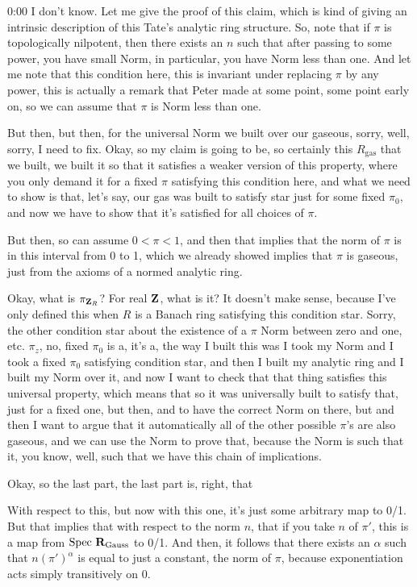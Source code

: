 \begin{unfinished}{0:00}
I don't know. Let me give the proof of this claim, which is kind of giving an intrinsic description of this Tate's analytic ring structure. So, note that if $\pi$ is topologically nilpotent, then there exists an $n$ such that after passing to some power, you have small Norm, in particular, you have Norm less than one. And let me note that this condition here, this is invariant under replacing $\pi$ by any power, this is actually a remark that Peter made at some point, some point early on, so we can assume that $\pi$ is Norm less than one.

But then, but then, for the universal Norm we built over our gaseous, sorry, well, sorry, I need to fix. Okay, so my claim is going to be, so certainly this $R_\mathrm{gas}$ that we built, we built it so that it satisfies a weaker version of this property, where you only demand it for a fixed $\pi$ satisfying this condition here, and what we need to show is that, let's say, our gas was built to satisfy star just for some fixed $\pi_0$, and now we have to show that it's satisfied for all choices of $\pi$.

But then, so can assume $0 < \pi < 1$, and then that implies that the norm of $\pi$ is in this interval from 0 to 1, which we already showed implies that $\pi$ is gaseous, just from the axioms of a normed analytic ring.

Okay, what is $\pi_{\mathbf Z_R}$? For real $\mathbf Z$, what is it? It doesn't make sense, because I've only defined this when $R$ is a Banach ring satisfying this condition star. Sorry, the other condition star about the existence of a $\pi$ Norm between zero and one, etc. $\pi_z$, no, fixed $\pi_0$ is a, it's a, the way I built this was I took my Norm and I took a fixed $\pi_0$ satisfying condition star, and then I built my analytic ring and I built my Norm over it, and now I want to check that that thing satisfies this universal property, which means that so it was universally built to satisfy that, just for a fixed one, but then, and to have the correct Norm on there, but and then I want to argue that it automatically all of the other possible $\pi$'s are also gaseous, and we can use the Norm to prove that, because the Norm is such that it, you know, well, such that we have this chain of implications.

Okay, so the last part, the last part is, right, that

With respect to this, but now with this one, it's just some arbitrary map to 0/1. But that implies that with respect to the norm $n$, that if you take $n$ of $\pi'$, this is a map from $\mathrm{Spec}\ \R_{\text{Gauss}}$ to 0/1. And then, it follows that there exists an $\alpha$ such that $n(\pi')^{\alpha}$ is equal to just a constant, the norm of $\pi$, because exponentiation acts simply transitively on 0.


\end{unfinished}
